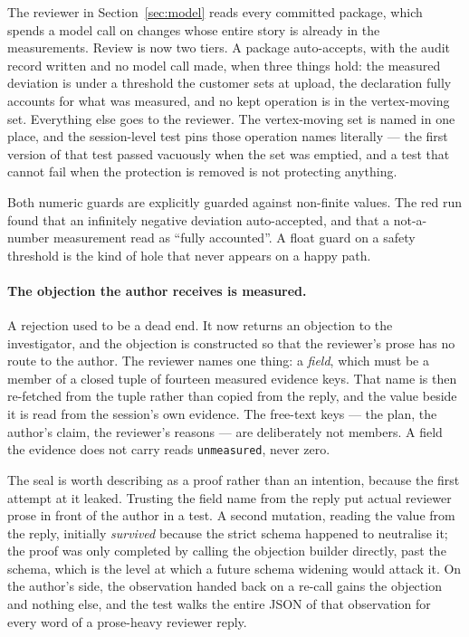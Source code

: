 \documentclass[11pt,onecolumn]{article}
\begin{document}
The reviewer in Section~\ref{sec:model} reads every committed package, which spends a model call on
changes whose entire story is already in the measurements. Review is now two tiers. A package
auto-accepts, with the audit record written and no model call made, when three things hold: the
measured deviation is under a threshold the customer sets at upload, the declaration fully accounts
for what was measured, and no kept operation is in the vertex-moving set. Everything else goes to
the reviewer. The vertex-moving set is named in one place, and the session-level test pins those
operation names literally --- the first version of that test passed vacuously when the set was
emptied, and a test that cannot fail when the protection is removed is not protecting anything.

Both numeric guards are explicitly guarded against non-finite values. The red run found that an
infinitely negative deviation auto-accepted, and that a not-a-number measurement read as ``fully
accounted''. A float guard on a safety threshold is the kind of hole that never appears on a happy
path.

\paragraph{The objection the author receives is measured.}
A rejection used to be a dead end. It now
returns an objection to the investigator, and the objection is constructed so that the reviewer's
prose has no route to the author. The reviewer names one thing: a \emph{field}, which must be a
member of a closed tuple of fourteen measured evidence keys. That name is then re-fetched from the
tuple rather than copied from the reply, and the value beside it is read from the session's own
evidence. The free-text keys --- the plan, the author's claim, the reviewer's reasons --- are
deliberately not members. A field the evidence does not carry reads \texttt{unmeasured}, never
zero.

The seal is worth describing as a proof rather than an intention, because the first attempt at it
leaked. Trusting the field name from the reply put actual reviewer prose in front of the author in
a test. A second mutation, reading the value from the reply, initially \emph{survived} because the
strict schema happened to neutralise it; the proof was only completed by calling the objection
builder directly, past the schema, which is the level at which a future schema widening would
attack it. On the author's side, the observation handed back on a re-call gains the objection and
nothing else, and the test walks the entire JSON of that observation for every word of a
prose-heavy reviewer reply.
\end{document}
